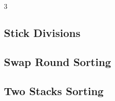 \documentclass[8pt]{extarticle}
\begin{document}
\begin{multicols*}{3}
\subsection{Stick Divisions}
\begin{caixaenunciado}

\end{caixaenunciado}
\vspace{0.3cm}


\subsection{Swap Round Sorting}
\begin{caixaenunciado}

\end{caixaenunciado}
\vspace{0.3cm}


\subsection{Two Stacks Sorting}
\begin{caixaenunciado}

\end{caixaenunciado}
\vspace{0.3cm}

\end{multicols*}
\end{document}
